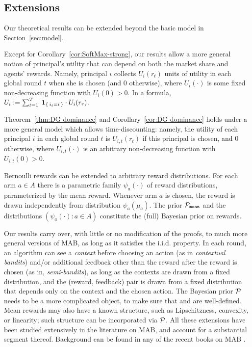 \subsection{Extensions}
\label{sec:theory-extensions}

Our theoretical results can be extended beyond the basic model in Section~\ref{sec:model}.


Except for Corollary~\ref{cor:SoftMax-strong}, our results allow a more general notion of principal's utility that can depend on both the market share and agents' rewards. Namely, principal $i$ collects $U_i(r_t)$ units of utility in each global round $t$ when she is chosen (and $0$ otherwise), where $U_i(\cdot)$ is some fixed non-decreasing function with $U_i(0)>0$. In a formula,
$U_i := \sum_{t=1}^T\; {\bf 1}_{\left\{\,i_t=i\,\right\}}\cdot U_i(r_r)$.

Theorem~\ref{thm:DG-dominance} and Corollary~\ref{cor:DG-dominance} holds under a more general model which allows time-discounting: namely, the utility of each principal $i$ in each global round $t$ is $U_{i,t}(r_t)$ if this principal is chosen, and $0$ otherwise, where $U_{i,t}(\cdot)$ is an arbitrary non-decreasing function with $U_{i,t}(0)>0$.

Bernoulli rewards can be extended to arbitrary reward distributions. For each arm $a\in A$ there is a parametric family $\psi_a(\cdot)$ of reward distributions, parameterized by the mean reward. Whenever arm $a$ is chosen, the reward is drawn independently from distribution $\psi_a(\mu_a)$. The prior $\mathcal{P}_\mathtt{mean}$ and the distributions $(\psi_a(\cdot)\colon a\in A)$ constitute the (full) Bayesian prior on rewards.%

 Our results carry over, with little or no modification of the proofs, to much more general versions of MAB, as long as it satisfies the i.i.d. property. In each round, an algorithm can see a \emph{context} before choosing an action (as in \emph{contextual bandits}) and/or additional feedback other than the reward after the reward is chosen (as in, \eg \emph{semi-bandits}), as long as the contexts are drawn from a fixed distribution, and the (reward, feedback) pair is drawn from a fixed distribution that depends only on the context and the chosen action. The Bayesian prior $\mathcal{P}$ needs to be a more complicated object, to make sure that \PMR and \BIR are well-defined. Mean rewards may also have a known structure, such as Lipschitzness, convexity, or linearity; such structure can be incorporated via $\mathcal{P}$. All these extensions have been studied extensively in the literature on MAB, and account for a substantial segment thereof. Background can be found in any of the recent books on MAB \citep{Bubeck-survey12,slivkins-MABbook,LS19bandit-book}.


